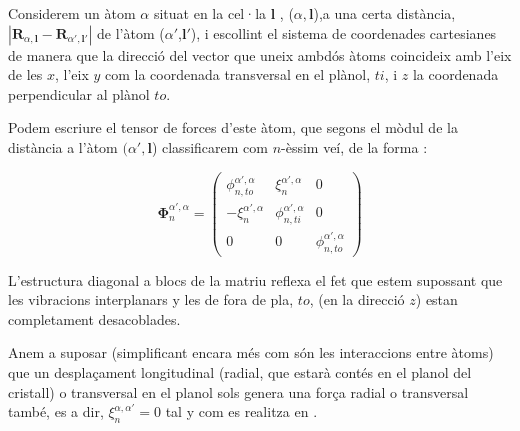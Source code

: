 \documentclass[12pt]{article} %
\let\vec\mathbf %
\begin{document}
{Considerem un àtom $\alpha$ situat en la cel·la $\vec l$ , ($\alpha, \vec l$),a una certa distància, $|\vec R_{\alpha,\vec l}-\vec R_{\alpha',\vec{l'}}|$ de l'àtom  ($\alpha'$,$\vec l'$), i escollint el sistema de coordenades cartesianes de manera que la direcció del vector que uneix ambdós àtoms coincideix amb l'eix de les $x$, l'eix $y$ com la coordenada transversal en el plànol, $ti$, i $z$ la coordenada perpendicular al plànol $to$.

Podem escriure el tensor de forces d'este àtom, que segons el mòdul de la distància a l'àtom $(\alpha',\vec l$) classificarem com $n$-èssim veí, de la forma \cite{wirtz04_phonon_disper_graph_revis}:


\begin{equation}
\vec\Phi_n^{\alpha',\alpha}=\begin{pmatrix}
\phi_{n,to}^{\alpha',\alpha}&\xi_n^{\alpha',\alpha} &0\\
-\xi_n^{\alpha',\alpha} & \phi_{n,ti}^{\alpha',\alpha} & 0 \\
0 & 0 & \phi_{n,to}^{\alpha',\alpha}
\end{pmatrix}
\label{eq:tensordeforces}
\end{equation}

L'estructura diagonal a blocs de la matriu reflexa el fet que estem supossant que  les vibracions interplanars y les de fora de pla, $to$, (en la direcció $z$) estan completament desacoblades.

Anem a suposar (simplificant encara més com són les interaccions entre àtoms) que un despla\c{c}ament longitudinal (radial, que estarà contés en el planol del cristall) o transversal en el planol sols genera una for\c{c}a radial o transversal també, es a dir, $\xi_n^{\alpha,\alpha'}=0$ tal y com es realitza en \cite{Balkanski_2000}. %






}
\end{document}
